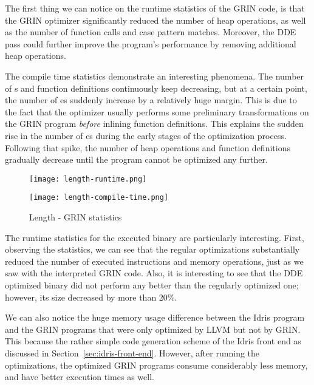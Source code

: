 \documentclass[main.tex]{subfiles}
\begin{document}
	The first thing we can notice on the runtime statistics of the GRIN code, is that the GRIN optimizer significantly reduced the number of heap operations, as well as the number of function calls and case pattern matches. Moreover, the DDE pass could further improve the program's performance by removing additional heap operations.
	
	The compile time statistics demonstrate an interesting phenomena. The number of s and function definitions continuously keep decreasing, but at a certain point, the number of es suddenly increase by a relatively huge margin. This is due to the fact that the optimizer usually performs some preliminary transformations on the GRIN program \emph{before} inlining function definitions. This explains the sudden rise in the number of es during the early stages of the optimization process. Following that spike, the number of heap operations and function definitions gradually decrease until the program cannot be optimized any further.
	
	\begin{figure}[h]
		\hspace{-0.5cm}
		\renewcommand{\figurename}{Diagram}
		\caption{Length - GRIN statistics}
		\label{diagram:length-stats}
		\addtocounter{figure}{-1}
		\begin{minipage}{0.5\textwidth}
			\label{diagram:length-stats-rt}
			\texttt{[image: length-runtime.png]}
		\end{minipage}
		\begin{minipage}{0.5\textwidth}
			\label{diagram:length-stats-ct}
			\texttt{[image: length-compile-time.png]}
		\end{minipage}
	\end{figure}

	The runtime statistics for the executed binary are particularly interesting. First, observing the  statistics, we can see that the regular optimizations substantially reduced the number of executed instructions and memory operations, just as we saw with the interpreted GRIN code. Also, it is interesting to see that the DDE optimized binary did not perform any better than the regularly optimized one;  however, its size decreased by more than 20\%. 
	
	We can also notice the huge memory usage difference between the Idris program and the GRIN programs that were only optimized by LLVM but not by GRIN. This because the rather simple code generation scheme of the Idris front end as discussed in Section~\ref{sec:idris-front-end}. However, after running the optimizations, the optimized GRIN programs consume considerably less memory, and have better execution times as well.
	
\end{document}
